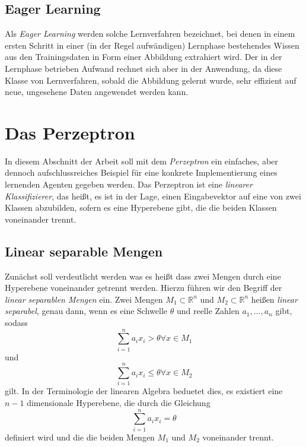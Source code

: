 \documentclass[fontsize=11pt]{scrartcl}
\begin{document}
            \subsection{Eager Learning}
                Als \emph{Eager Learning} werden solche Lernverfahren bezeichnet, bei denen in einem ersten Schritt in einer (in der Regel aufwändigen) Lernphase bestehendes Wissen aus den Trainingsdaten in Form einer Abbildung extrahiert wird.
                Der in der Lernphase betrieben Aufwand rechnet sich aber in der Anwendung, da diese Klasse von Lernverfahren, sobald die Abbildung gelernt wurde, sehr effizient auf neue, ungesehene Daten angewendet werden kann.\cite{ertel2016} 

        \section{Das Perzeptron}
        \label{sec:perzeptron}
            In diesem Abschnitt der Arbeit soll mit dem \emph{Perzeptron} ein einfaches, aber dennoch aufschlussreiches Beispiel für eine konkrete Implementierung eines lernenden Agenten gegeben werden.
            \newline
            Das Perzeptron ist eine \emph{linearer Klassifizierer}, das heißt, es ist in der Lage, einen Eingabevektor auf eine von zwei Klassen abzubilden, sofern es eine Hyperebene gibt, die die beiden Klassen voneinander trennt\cite{ertel2016}.

            \subsection{Linear separable Mengen}
            \label{subsec:lernverfahren}
                Zunächst soll verdeutlicht werden was es heißt dass zwei Mengen durch eine Hyperebene voneinander getrennt werden.
                Hierzu führen wir den Begriff der 
                \emph{linear separablen Mengen} ein.
                \newline
                Zwei Mengen $M_1 \subset \mathbb{R}^n$ und $M_2 \subset \mathbb{R}^n$ heißen \emph{linear separabel}, genau dann, wenn es eine Schwelle $\theta$ und reelle Zahlen $a_1,\dots,a_n$ gibt, sodass
                $$
                    \sum_{i=1}^n a_ix_i > \theta \forall x \in M_1$$
                und
                $$\sum_{i=1}^n a_ix_i \leq \theta \forall x \in M_2$$
                gilt\cite{ertel2016}.
                \newline
                In der Terminologie der linearen Algebra beduetet dies, es existiert eine $n-1$ dimensionale Hyperebene, die durch die Gleichung
                $$
                    \sum_{i=1}^n a_ix_i = \theta
                $$
                definiert wird und die die beiden Mengen $M_1$ und $M_2$ voneinander trennt.
\end{document}
